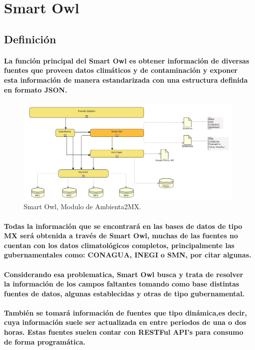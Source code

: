 \section{Smart Owl}
  \subsection{Definición}
  \paragraph{La función principal del Smart Owl es obtener información de diversas fuentes que proveen datos climáticos y de contaminación y exponer esta información de manera estandarizada con una estructura definida en formato JSON.}

  \begin{figure}[h!]
    \centering
      \includegraphics[width=\textwidth]{./images/DiagramaAmbienta2MX_SmartOwl.png}
    \caption{Smart Owl, Modulo de Ambienta2MX.} 
  \end{figure}

  \paragraph{Todas la información que se encontrará en las bases de datos de tipo MX será obtenida a través de Smart Owl, muchas de las fuentes no cuentan con los datos climatológicos completos, principalmente las gubernamentales como: CONAGUA, INEGI o SMN, por citar algunas.}
  \paragraph{Considerando esa problematica, Smart Owl busca y trata de resolver la información de los campos faltantes tomando como base distintas fuentes de datos, algunas establecidas y otras de tipo gubernamental.}
  \paragraph{También se tomará información de fuentes que tipo dinámica,es decir, cuya información suele ser actualizada en entre periodos de una o dos horas. Estas fuentes suelen contar con RESTFul API's para consumo de forma programática.}
